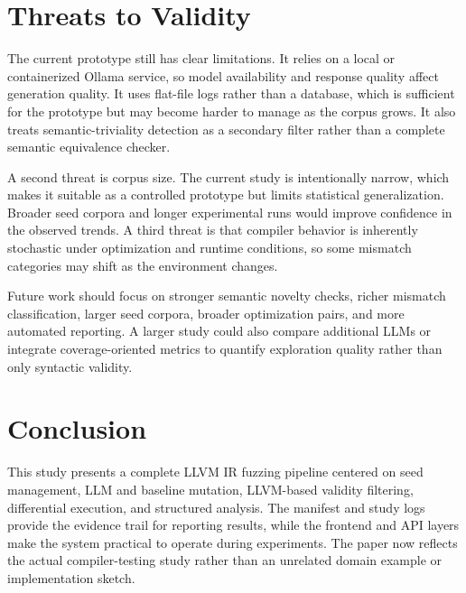 \documentclass[journal]{IEEEtran}
\begin{document}
\section{Threats to Validity}

The current prototype still has clear limitations. It relies on a local or containerized Ollama service, so model availability and response quality affect generation quality. It uses flat-file logs rather than a database, which is sufficient for the prototype but may become harder to manage as the corpus grows. It also treats semantic-triviality detection as a secondary filter rather than a complete semantic equivalence checker.

A second threat is corpus size. The current study is intentionally narrow, which makes it suitable as a controlled prototype but limits statistical generalization. Broader seed corpora and longer experimental runs would improve confidence in the observed trends. A third threat is that compiler behavior is inherently stochastic under optimization and runtime conditions, so some mismatch categories may shift as the environment changes.

Future work should focus on stronger semantic novelty checks, richer mismatch classification, larger seed corpora, broader optimization pairs, and more automated reporting. A larger study could also compare additional LLMs or integrate coverage-oriented metrics to quantify exploration quality rather than only syntactic validity.

\section{Conclusion}

This study presents a complete LLVM IR fuzzing pipeline centered on seed management, LLM and baseline mutation, LLVM-based validity filtering, differential execution, and structured analysis. The manifest and study logs provide the evidence trail for reporting results, while the frontend and API layers make the system practical to operate during experiments. The paper now reflects the actual compiler-testing study rather than an unrelated domain example or implementation sketch.
\end{document}

